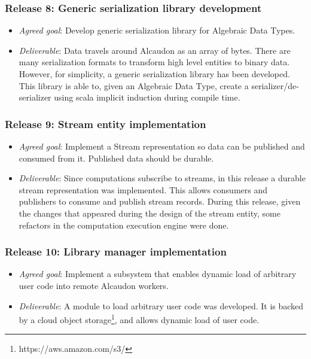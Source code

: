 \subsubsection{Release 8: Generic serialization library development}
\begin{itemize}
\item \textit{Agreed goal}: Develop generic serialization library for Algebraic
  Data Types.
\item \textit{Deliverable}: Data travels around Alcaudon as an array of bytes.
  There are many serialization formats to transform high level entities to
  binary data. However, for simplicity, a generic serialization library has been
  developed. This library is able to, given an Algebraic Data Type, create a
  serializer/de-serializer using scala implicit induction during compile time.
\end{itemize}

\subsubsection{Release 9: Stream entity implementation}
\begin{itemize}
\item \textit{Agreed goal}: Implement a Stream representation so data can be
  published and consumed from it. Published data should be durable.
\item \textit{Deliverable}: Since computations subscribe to streams, in this release a
  durable stream representation was implemented. This allows consumers and publishers to
  consume and publish stream records. During this release, given the changes
  that appeared during the design of the stream entity, some refactors in the
  computation execution engine were done.
\end{itemize}

\subsubsection{Release 10: Library manager implementation}
\begin{itemize}
\item \textit{Agreed goal}: Implement a subsystem that enables dynamic load of
  arbitrary user code into remote Alcaudon workers.
\item \textit{Deliverable}: A module to load arbitrary user code was developed.
  It is backed by a cloud object storage\footnote{https://aws.amazon.com/s3/},
  and allows dynamic load of user code.
\end{itemize}

